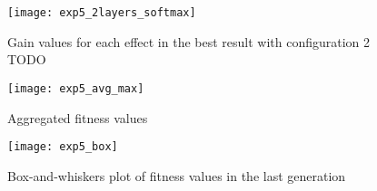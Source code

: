 \begin{figure}[h]
    \centering
    \texttt{[image: exp5\_2layers\_softmax]}
    \caption{Gain values for each effect in the best result with configuration 2 TODO}
    \label{fig:exp5_2layers_softmax}
\end{figure}

\begin{figure}[h]
    \centering
    \texttt{[image: exp5\_avg\_max]}
    \caption{Aggregated fitness values}
    \label{fig:exp5_avg_max}
\end{figure}

\begin{figure}[h]
    \centering
    \texttt{[image: exp5\_box]}
    \caption{Box-and-whiskers plot of fitness values in the last generation}
    \label{fig:exp5_box}
\end{figure}
